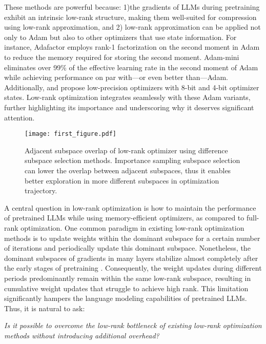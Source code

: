 These methods are powerful because: 1)the gradients of LLMs during pretraining exhibit an intrinsic low-rank structure, making them well-suited for compression using low-rank approximation, and 2) low-rank approximation can be applied not only to Adam but also to other optimizers that use state information.
For instance, Adafactor \cite{shazeer2018adafactor} employs rank-1 factorization on the second moment in Adam to reduce the memory required for storing the second moment. Adam-mini \cite{zhang2024adam-mini} eliminates over 99\% of the effective learning rate in the second moment of Adam while achieving performance on par with—or even better than—Adam. Additionally, \cite{dettmers20218} and \cite{li2024memory} propose low-precision optimizers with 8-bit and 4-bit optimizer states.
Low-rank optimization integrates seamlessly with these Adam variants, further highlighting its importance and underscoring why it deserves significant attention.

\begin{figure}[!ht]
    \centering
    \texttt{[image: first\_figure.pdf]}
    \caption{Adjacent subspace overlap of low-rank optimizer using difference subspace selection methods. Importance sampling subspace selection can lower the overlap between adjacent subspaces, thus it enables better exploration in more different subspaces in optimization trajectory.}
    \label{fig:first_figure}
\end{figure} 


A central question in low-rank optimization is how to maintain the performance of pretrained LLMs while using memory-efficient optimizers, as compared to full-rank optimization.
One common paradigm in existing low-rank optimization methods is to update weights within the dominant subspace for a certain number of iterations and periodically update this dominant subspace. Nonetheless, the dominant subspaces of gradients in many layers stabilize almost completely after the early stages of pretraining \cite{zhang2024q-galore}. Consequently, the weight updates during different periods predominantly remain within the same low-rank subspace, resulting in cumulative weight updates that struggle to achieve high rank. This limitation significantly hampers the language modeling capabilities of pretrained LLMs.
Thus, it is natural to ask:
\begin{center}
    {\it Is it possible to overcome the low-rank bottleneck of existing low-rank optimization methods without introducing additional overhead?}
\end{center}

